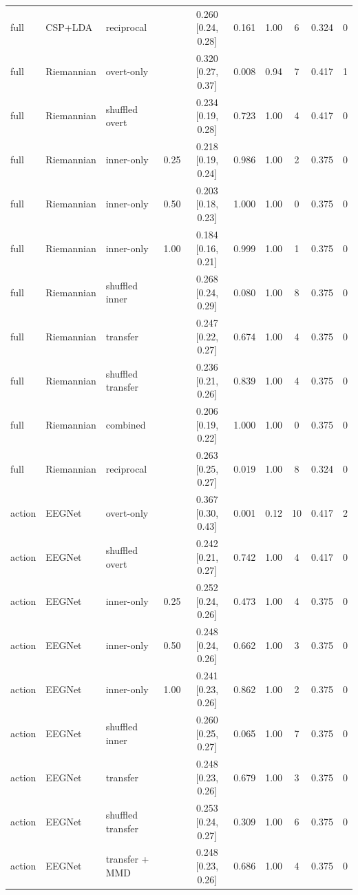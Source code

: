 \begin{longtable}{llllcccccc}
full & CSP+LDA & reciprocal &  & 0.260 [0.24, 0.28] & 0.161 & 1.00 & 6 & 0.324 & 0 \\
full & Riemannian & overt-only &  & 0.320 [0.27, 0.37] & 0.008 & 0.94 & 7 & 0.417 & 1 \\
full & Riemannian & shuffled overt &  & 0.234 [0.19, 0.28] & 0.723 & 1.00 & 4 & 0.417 & 0 \\
full & Riemannian & inner-only & 0.25 & 0.218 [0.19, 0.24] & 0.986 & 1.00 & 2 & 0.375 & 0 \\
full & Riemannian & inner-only & 0.50 & 0.203 [0.18, 0.23] & 1.000 & 1.00 & 0 & 0.375 & 0 \\
full & Riemannian & inner-only & 1.00 & 0.184 [0.16, 0.21] & 0.999 & 1.00 & 1 & 0.375 & 0 \\
full & Riemannian & shuffled inner &  & 0.268 [0.24, 0.29] & 0.080 & 1.00 & 8 & 0.375 & 0 \\
full & Riemannian & transfer &  & 0.247 [0.22, 0.27] & 0.674 & 1.00 & 4 & 0.375 & 0 \\
full & Riemannian & shuffled transfer &  & 0.236 [0.21, 0.26] & 0.839 & 1.00 & 4 & 0.375 & 0 \\
full & Riemannian & combined &  & 0.206 [0.19, 0.22] & 1.000 & 1.00 & 0 & 0.375 & 0 \\
full & Riemannian & reciprocal &  & 0.263 [0.25, 0.27] & 0.019 & 1.00 & 8 & 0.324 & 0 \\
action & EEGNet & overt-only &  & 0.367 [0.30, 0.43] & 0.001 & 0.12 & 10 & 0.417 & 2 \\
action & EEGNet & shuffled overt &  & 0.242 [0.21, 0.27] & 0.742 & 1.00 & 4 & 0.417 & 0 \\
action & EEGNet & inner-only & 0.25 & 0.252 [0.24, 0.26] & 0.473 & 1.00 & 4 & 0.375 & 0 \\
action & EEGNet & inner-only & 0.50 & 0.248 [0.24, 0.26] & 0.662 & 1.00 & 3 & 0.375 & 0 \\
action & EEGNet & inner-only & 1.00 & 0.241 [0.23, 0.26] & 0.862 & 1.00 & 2 & 0.375 & 0 \\
action & EEGNet & shuffled inner &  & 0.260 [0.25, 0.27] & 0.065 & 1.00 & 7 & 0.375 & 0 \\
action & EEGNet & transfer &  & 0.248 [0.23, 0.26] & 0.679 & 1.00 & 3 & 0.375 & 0 \\
action & EEGNet & shuffled transfer &  & 0.253 [0.24, 0.27] & 0.309 & 1.00 & 6 & 0.375 & 0 \\
action & EEGNet & transfer + MMD &  & 0.248 [0.23, 0.26] & 0.686 & 1.00 & 4 & 0.375 & 0 \\

\end{longtable}
